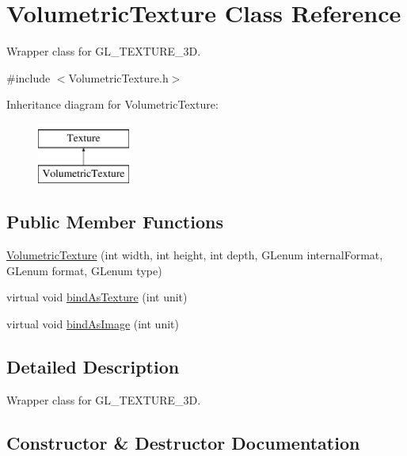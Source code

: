 \hypertarget{class_volumetric_texture}{}\section{Volumetric\+Texture Class Reference}
\label{class_volumetric_texture}


Wrapper class for G\+L\+\_\+\+T\+E\+X\+T\+U\+R\+E\+\_\+3D.  




{\ttfamily \#include $<$Volumetric\+Texture.\+h$>$}

Inheritance diagram for Volumetric\+Texture\+:\begin{figure}[H]
\begin{center}
\leavevmode
\includegraphics[height=2.000000cm]{class_volumetric_texture}
\end{center}
\end{figure}
\subsection*{Public Member Functions}
\begin{DoxyCompactItemize}
\item 
\mbox{\hyperlink{class_volumetric_texture_a70ced10d0c65766cc8faf3f11b293633}{Volumetric\+Texture}} (int width, int height, int depth, G\+Lenum internal\+Format, G\+Lenum format, G\+Lenum type)
\item 
virtual void \mbox{\hyperlink{class_volumetric_texture_ab151b11d41cb83bcb4fbbe5bbd319ec3}{bind\+As\+Texture}} (int unit)
\item 
virtual void \mbox{\hyperlink{class_volumetric_texture_a148e0b996afc42e622a7533d5c57a8d7}{bind\+As\+Image}} (int unit)
\end{DoxyCompactItemize}


\subsection{Detailed Description}
Wrapper class for G\+L\+\_\+\+T\+E\+X\+T\+U\+R\+E\+\_\+3D. 



\subsection{Constructor \& Destructor Documentation}
\mbox{\label{class_volumetric_texture_a70ced10d0c65766cc8faf3f11b293633}} 
